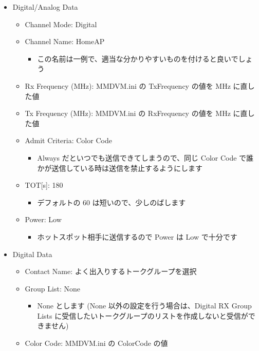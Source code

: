 \documentclass[a4j,oneside]{ujbook}
\begin{document}
\begin{itemize}
 \item Digital/Analog Data
 \begin{itemize} 
  \item Channel Mode: Digital
  \item Channel Name: HomeAP
  \begin{itemize}
   \renewcommand{\labelitemiii}{$\triangleright$}
   \item この名前は一例で、適当な分かりやすいものを付けると良いでしょう
  \end{itemize}
  \item Rx Frequency (MHz): MMDVM.ini の TxFrequency の値を MHz に直した値
  \item Tx Frequency (MHz): MMDVM.ini の RxFrequency の値を MHz に直した値
  \item Admit Criteria: Color Code
  \begin{itemize}
   \renewcommand{\labelitemiii}{$\triangleright$}
   \item Always だといつでも送信できてしまうので、同じ Color Code で誰かが送信している時は送信を禁止するようにします
  \end{itemize}
  \item TOT[s]: 180
  \begin{itemize}
   \renewcommand{\labelitemiii}{$\triangleright$}
   \item デフォルトの 60 は短いので、少しのばします
  \end{itemize}
  \item Power: Low
  \begin{itemize}
   \renewcommand{\labelitemiii}{$\triangleright$}
   \item ホットスポット相手に送信するので Power は Low で十分です
  \end{itemize}
 \end{itemize}
 \item Digital Data
 \begin{itemize}
  \item Contact Name: よく出入りするトークグループを選択
  \item Group List: None
  \begin{itemize}
   \renewcommand{\labelitemiii}{$\triangleright$}
   \item None とします (None 以外の設定を行う場合は、Digital RX Group Lists に受信したいトークグループのリストを作成しないと受信ができません)
  \end{itemize}
  \item Color Code: MMDVM.ini の ColorCode の値

\end{itemize}
\end{itemize}
\end{document}
